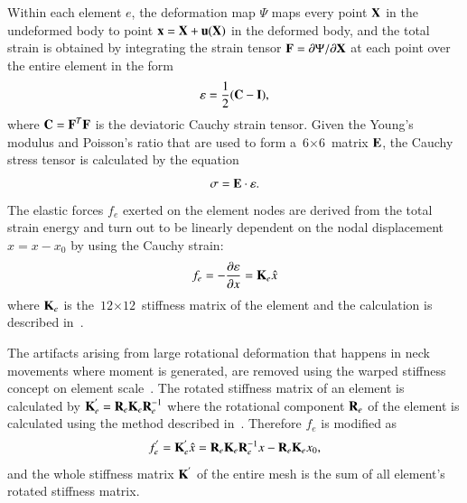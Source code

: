 Within each element $e$, the deformation map $\Psi$ maps every point $\mbox{\textbf{X}}$ in the undeformed body to point $\mbox{\textbf{x}}=\mbox{\textbf{X}}+\mbox{\textbf{u}}(\mbox{\textbf{X}})$
in the deformed body, and the total strain is obtained by integrating the strain tensor $\mbox{\textbf{F}}=\partial\Psi/\partial\mbox{\textbf{X}}$ at each point over the entire element in the form \begin{equation}
\varepsilon = \frac{1}{2}(\mbox{\textbf{C}}-\mbox{\textbf{I}}),
\end{equation} where $\mbox{\textbf{C}}=\mbox{\textbf{F}}^{T}\mbox{\textbf{F}}$ is the deviatoric Cauchy strain tensor. Given the Young's modulus and Poisson's ratio that are used to form a $\mbox{6}\times\mbox{6}$
matrix $\mbox{\textbf{E}}$, the Cauchy stress tensor is calculated by the equation
\begin{equation}
\sigma = \mbox{\textbf{E}}\cdot\varepsilon.
\end{equation}
The elastic forces $f_{e}$ exerted on the element nodes are derived from the total strain energy and turn out to be linearly dependent on the nodal displacement $\hat{x}=x-x_{0}$ by using the Cauchy strain:
\begin{equation}
f_{e}=-\frac{\partial\varepsilon}{\partial x} = \mbox{\textbf{K}}_{e}\hat{x}
\end{equation}
where $\mbox{\textbf{K}}_{e}$ is the $\mbox{12}\times\mbox{12}$ stiffness matrix of the element and the calculation is described in~\cite{Muller:2002:SRD}.

The artifacts arising from large rotational deformation that happens in neck movements where moment is generated, are removed using the warped stiffness concept on element scale~\cite{Muller:2004:IVM}. The rotated stiffness matrix of an element is calculated by
$\mbox{\textbf{K}}^{'}_{e}=\mbox{\textbf{R}}_{e}\mbox{\textbf{K}}_{e}\mbox{\textbf{R}}^{-1}_{e}$
where the rotational component $\mbox{\textbf{R}}_{e}$ of the element is calculated using the method described in~\cite{Muller:2002:SRD}. Therefore $f_{e}$ is modified as
\begin{equation}
f^{'}_{e}=\mbox{\textbf{K}}^{'}_{e}\hat{x} =
\mbox{\textbf{R}}_{e}\mbox{\textbf{K}}_{e}\mbox{\textbf{R}}^{-1}_{e}x-\mbox{\textbf{R}}_{e}\mbox{\textbf{K}}_{e}x_{0},
\end{equation}
and the whole stiffness matrix $\mbox{\textbf{K}}^{'}$ of the entire mesh is the sum of all element's rotated stiffness matrix.

